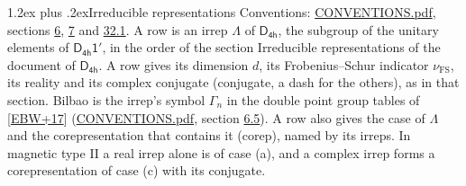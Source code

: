 \documentclass[10pt,a4paper]{article}
\makeatletter
\renewcommand\section{\@startsection{section}{1}{\z@}{-3ex plus -1ex minus -.2ex}%
  {1.2ex plus .2ex}{\normalfont\large\sffamily\bfseries\color{parttitle}}}
\numberwithin{equation}{section}
\newcommand{\grp}[1]{\mathsf{#1}}
\newcommand{\fsind}{\nu_{\mathrm{FS}}}
\makeatother
\begin{document}
\section{Irreducible representations}\label{s:irreps}
Conventions: \href{../../CONVENTIONS.pdf}{CONVENTIONS.pdf}, sections \href{../../../rotation/CONVENTIONS.pdf\#conv.6}{6}, \href{../../../rotation/CONVENTIONS.pdf\#conv.7}{7} and \href{../../CONVENTIONS.pdf\#conv.32.1}{32.1}.
\leavevmode\label{n:irrep.Delta}A row is an irrep $\Lambda$ of $\grp{D_{4h}}$, the subgroup of the unitary elements of $\grp{D_{4h}1'}$, in the order of the section Irreducible representations of the document of \href{../../../rotation/data/pdf/D4h.pdf}{$\grp{D_{4h}}$}. \label{n:index.dimension}\label{n:index.frobenius}\label{n:head.irrep}\label{n:head.reality}\label{n:head.conjugate}A row gives its dimension $d$, its Frobenius--Schur indicator $\fsind$, its reality and its complex conjugate (conjugate, a dash for the others), as in that section. \label{n:head.bilbao}\label{n:irrep.alias.gamma}Bilbao is the irrep's symbol $\Gamma_n$ in the double point group tables of [\href{../../../REFERENCES.pdf\#ref.EBW+17}{EBW+17}] (\href{../../CONVENTIONS.pdf}{CONVENTIONS.pdf}, section \href{../../../rotation/CONVENTIONS.pdf\#conv.6.5}{6.5}). \label{n:head.case.corep}\label{n:head.corep}A row also gives the case of $\Lambda$ and the corepresentation that contains it (corep), named by its irreps. In magnetic type II a real irrep alone is of case (a), and a complex irrep forms a corepresentation of case (c) with its conjugate.
\setlength{\emergencystretch}{2em}\par\setlength{\emergencystretch}{0pt}
\end{document}

